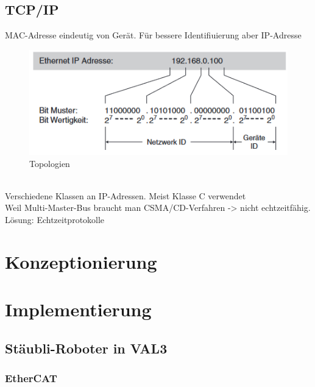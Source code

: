 \documentclass[ a4paper,
                oneside,
                toc=bibliography,
                toc=listof
                ]{scrbook}
\begin{document}
	\section{TCP/IP}
   
   	MAC-Adresse eindeutig von Gerät. Für bessere Identifiuierung aber IP-Adresse
   	\begin{figure}[!ht]
   		\centering
   		\includegraphics[width=0.70\linewidth]{./images/IP Adresse Aufbau.png}
   		\caption{Topologien}
   		\label{fig:Topologien}
   	\end{figure}
   	\\
   	Verschiedene Klassen an IP-Adressen. Meist Klasse C verwendet
   	\\
   	Weil Multi-Master-Bus braucht man CSMA/CD-Verfahren -> nicht echtzeitfähig. Lösung: Echtzeitprotokolle
   	\\
   	
	\newpage
	\chapter{Konzeptionierung}
	
	\newpage
	\chapter{Implementierung}
	
	\section{Stäubli-Roboter in VAL3}
	
	\subsection{EtherCAT}
	
\end{document}
